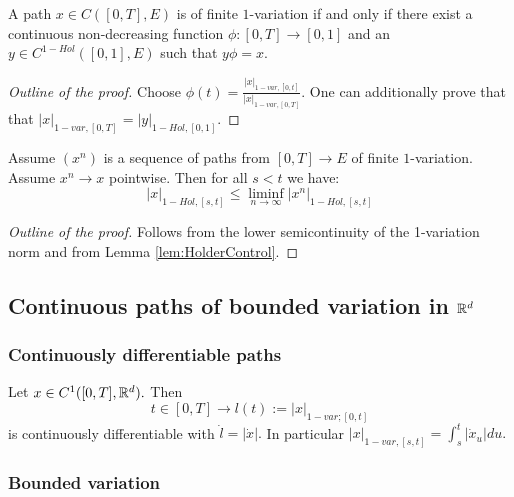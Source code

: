 \begin{proposition}[Reparametrization]
    A path $x \in C([0,T], E)$ is of finite $1$-variation if and only if there exist a continuous non-decreasing function $\phi:[0,T] \rightarrow [0,1]$ and an $y \in C^{1-Hol}([0,1], E)$ such that $y\phi= x.$
\end{proposition}
\begin{proof}[Outline of the proof]
    Choose $\phi(t) = \frac{|x|_{1-var,[0,t]}}{|x|_{1-var,[0,T]}}$.
    One can additionally prove that that $|x|_{1-var,[0,T]}=|y|_{1-Hol,[0,1]}$.
\end{proof}

\begin{lemma}
    Assume $(x^n)$ is a sequence of paths from $[0,T] \rightarrow E$ of finite $1$-variation. Assume $x^n \rightarrow x$ pointwise. Then for all $s < t$ we have:
    \begin{equation}
        |x|_{1-Hol, [s,t]} \leq \liminf_{n \rightarrow \infty} |x^n|_{1-Hol, [s,t]}
    \end{equation}
\end{lemma}
\begin{proof}[Outline of the proof]
    Follows from the lower semicontinuity of the 1-variation norm and from Lemma \ref{lem:HolderControl}.
\end{proof}

\subsection{Continuous paths of bounded variation in $\mathbb{R}^d$}

\subsubsection{Continuously differentiable paths}

\begin{proposition}
    Let $x \in C^1([0,T], \mathbb{R}^d).$ Then 
    \begin{equation}
        t \in [0,T] \rightarrow l(t) := |x|_{1-var; [0,t]}
    \end{equation}
    is continuously differentiable with $\dot{l} = |\dot{x}|.$
    In particular $|x|_{1-var, [s,t]} = \int_s^t |\dot{x}_u| du.$
\end{proposition}

\subsubsection{Bounded variation}

